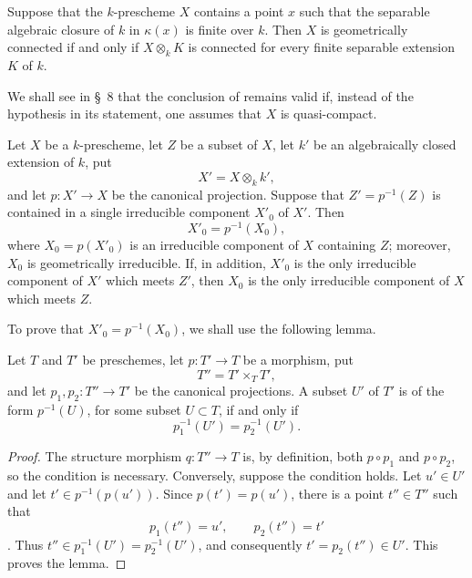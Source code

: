 
\begin{corollary}[4.5.17]
\label{IV.4.5.17}
Suppose that the $k$-prescheme $X$ contains a point $x$ such that the
separable algebraic closure of $k$ in $\kappa(x)$ is finite over $k$.
Then $X$ is geometrically connected if and only if
$X\otimes_k K$ is connected for every finite separable extension
$K$ of $k$.
\end{corollary}

\begin{remark}[4.5.18]
\label{IV.4.5.18}
We shall see in \S~8  that the conclusion of
 remains valid if, instead of the hypothesis in its
statement, one assumes that $X$ is quasi-compact.
\end{remark}

\begin{proposition}[4.5.19]
\label{IV.4.5.19}
Let $X$ be a $k$-prescheme, let $Z$ be a subset of $X$, let $k'$ be
an algebraically closed extension of $k$, put
\[
X'=X\otimes_k k',
\]
and let $p:X'\to X$ be the canonical projection.
Suppose that $Z'=p^{-1}(Z)$ is contained in a single irreducible
component $X'_0$ of $X'$.
Then
\[
X'_0=p^{-1}(X_0),
\]
where $X_0=p(X'_0)$ is an irreducible component of $X$ containing
$Z$; moreover, $X_0$ is geometrically irreducible.
If, in addition, $X'_0$ is the only irreducible component of $X'$
which meets $Z'$, then $X_0$ is the only irreducible component of $X$
which meets $Z$.
\end{proposition}

To prove that $X'_0=p^{-1}(X_0)$, we shall use the following lemma.

\begin{lemma}[4.5.19.1]
\label{IV.4.5.19.1}
Let $T$ and $T'$ be preschemes, let $p:T'\to T$ be a morphism, put
\[
T''=T'\times_T T',
\]
and let $p_1,p_2:T''\to T'$ be the canonical projections.
A subset $U'$ of $T'$ is of the form $p^{-1}(U)$, for some subset
$U\subset T$, if and only if
\[
p_1^{-1}(U')=p_2^{-1}(U').
\]
\end{lemma}

\begin{proof}
The structure morphism $q:T''\to T$ is, by definition, both
$p\circ p_1$ and $p\circ p_2$, so the condition is necessary.
Conversely, suppose the condition holds.
Let $u'\in U'$ and let $t'\in p^{-1}(p(u'))$.
Since $p(t')=p(u')$, there is a point $t''\in T''$ such that
\[
p_1(t'')=u',\qquad p_2(t'')=t'
\]
.
Thus
$t''\in p_1^{-1}(U')=p_2^{-1}(U')$, and consequently
$t'=p_2(t'')\in U'$.
This proves the lemma.
\end{proof}

